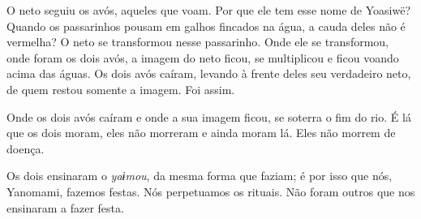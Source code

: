 O neto seguiu os avós, aqueles que voam. Por que ele tem esse nome de
Yoasiwë? Quando os passarinhos pousam em galhos fincados na água, a
cauda deles não é vermelha? O neto se transformou nesse passarinho. Onde
ele se transformou, onde foram os dois avós, a imagem do neto ficou, se
multiplicou e ficou voando acima das águas. Os dois avós caíram, levando
à frente deles seu verdadeiro neto, de quem restou somente a imagem.
Foi assim. 

Onde os dois avós caíram e onde a sua imagem ficou, se soterra o fim do
rio. É lá que os dois moram, eles não morreram e ainda moram lá. Eles
não morrem de doença. 

Os dois ensinaram o \emph{yaɨmou}, da mesma forma que faziam;
é por isso que nós, Yanomami, fazemos festas. Nós perpetuamos os
rituais. Não foram outros que nos ensinaram a fazer festa. 